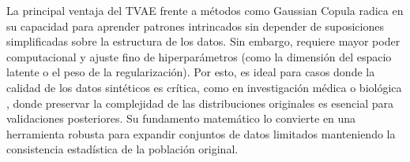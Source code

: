 \documentclass[a4paper,10pt,spanish]{jupyterBook}
\begin{document}
\sphinxAtStartPar
La principal ventaja del TVAE frente a métodos como Gaussian Copula radica en su capacidad para aprender patrones intrincados sin depender de suposiciones simplificadas sobre la estructura de los datos. Sin embargo, requiere mayor poder computacional y ajuste fino de hiperparámetros (como la dimensión del espacio latente o el peso de la regularización). Por esto, es ideal para casos donde la calidad de los datos sintéticos es crítica, como en investigación médica o biológica , donde preservar la complejidad de las distribuciones originales es esencial para validaciones posteriores. Su fundamento matemático lo convierte en una herramienta robusta para expandir conjuntos de datos limitados manteniendo la consistencia estadística de la población original.
\end{document}
